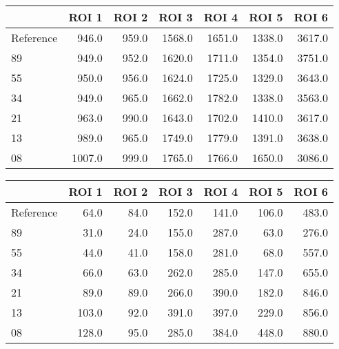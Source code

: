 \begin{tabular}{lrrrrrr}
\toprule
{} &   ROI 1 &  ROI 2 &   ROI 3 &   ROI 4 &   ROI 5 &   ROI 6 \\
\midrule
Reference &   946.0 &  959.0 &  1568.0 &  1651.0 &  1338.0 &  3617.0 \\
89        &   949.0 &  952.0 &  1620.0 &  1711.0 &  1354.0 &  3751.0 \\
55        &   950.0 &  956.0 &  1624.0 &  1725.0 &  1329.0 &  3643.0 \\
34        &   949.0 &  965.0 &  1662.0 &  1782.0 &  1338.0 &  3563.0 \\
21        &   963.0 &  990.0 &  1643.0 &  1702.0 &  1410.0 &  3617.0 \\
13        &   989.0 &  965.0 &  1749.0 &  1779.0 &  1391.0 &  3638.0 \\
08        &  1007.0 &  999.0 &  1765.0 &  1766.0 &  1650.0 &  3086.0 \\
\bottomrule
\end{tabular}
\begin{tabular}{lrrrrrr}
\toprule
{} &  ROI 1 &  ROI 2 &  ROI 3 &  ROI 4 &  ROI 5 &  ROI 6 \\
\midrule
Reference &   64.0 &   84.0 &  152.0 &  141.0 &  106.0 &  483.0 \\
89        &   31.0 &   24.0 &  155.0 &  287.0 &   63.0 &  276.0 \\
55        &   44.0 &   41.0 &  158.0 &  281.0 &   68.0 &  557.0 \\
34        &   66.0 &   63.0 &  262.0 &  285.0 &  147.0 &  655.0 \\
21        &   89.0 &   89.0 &  266.0 &  390.0 &  182.0 &  846.0 \\
13        &  103.0 &   92.0 &  391.0 &  397.0 &  229.0 &  856.0 \\
08        &  128.0 &   95.0 &  285.0 &  384.0 &  448.0 &  880.0 \\
\bottomrule
\end{tabular}
